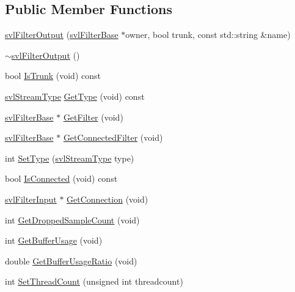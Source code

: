 \subsection*{Public Member Functions}
\begin{DoxyCompactItemize}
\item 
\hyperlink{classsvl_filter_output_a97fb74a94034199e0b7481e92d8c989e}{svl\-Filter\-Output} (\hyperlink{classsvl_filter_base}{svl\-Filter\-Base} $\ast$owner, bool trunk, const std\-::string \&name)
\item 
\hyperlink{classsvl_filter_output_afcc1539960b0109c83403c121fb1d44a}{$\sim$svl\-Filter\-Output} ()
\item 
bool \hyperlink{classsvl_filter_output_aa7f056a54929e4d41a9e9f34e8247318}{Is\-Trunk} (void) const 
\item 
\hyperlink{svl_definitions_8h_aa00696d338a58db361335a01fd11e122}{svl\-Stream\-Type} \hyperlink{classsvl_filter_output_a10b0e55f8d32ff9bb201d69dd4429905}{Get\-Type} (void) const 
\item 
\hyperlink{classsvl_filter_base}{svl\-Filter\-Base} $\ast$ \hyperlink{classsvl_filter_output_ab334ce91aeb67c738e722f260bc30389}{Get\-Filter} (void)
\item 
\hyperlink{classsvl_filter_base}{svl\-Filter\-Base} $\ast$ \hyperlink{classsvl_filter_output_a397b05759383671c2a781506e1d41009}{Get\-Connected\-Filter} (void)
\item 
int \hyperlink{classsvl_filter_output_a371e969cac1e7b7c8fadba8b23534e8b}{Set\-Type} (\hyperlink{svl_definitions_8h_aa00696d338a58db361335a01fd11e122}{svl\-Stream\-Type} type)
\item 
bool \hyperlink{classsvl_filter_output_a72bc74e1bfd1a7304caa864feb837c6e}{Is\-Connected} (void) const 
\item 
\hyperlink{classsvl_filter_input}{svl\-Filter\-Input} $\ast$ \hyperlink{classsvl_filter_output_af6572856fbffd33874a025591b419ef0}{Get\-Connection} (void)
\item 
int \hyperlink{classsvl_filter_output_ac56ede1ebac6ace45de3c456058105c4}{Get\-Dropped\-Sample\-Count} (void)
\item 
int \hyperlink{classsvl_filter_output_acd6f1cfffc6c43644cafde324bae32b6}{Get\-Buffer\-Usage} (void)
\item 
double \hyperlink{classsvl_filter_output_a0e0254ca5edc31adbf5c0aeea73376cd}{Get\-Buffer\-Usage\-Ratio} (void)
\item 
int \hyperlink{classsvl_filter_output_adc9db7b70941dfce280fed63dbdf46cd}{Set\-Thread\-Count} (unsigned int threadcount)

\end{DoxyCompactItemize}
